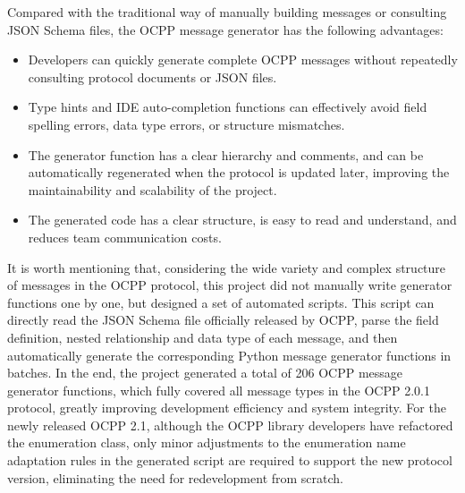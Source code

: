 \documentclass[
	english,
	ruledheaders=section,%
	class=report,%
	thesis={type=Report},%
	accentcolor=9c,%
	custommargins=true,%
	marginpar=false,%
	parskip=half-,%
	fontsize=11pt,%
	logofile={img/tuda_logo.pdf}, %
]{tudapub}
\begin{document}
Compared with the traditional way of manually building messages or consulting JSON Schema files, the \ac{OCPP} message generator has the following advantages:
\begin{itemize}
    \item Developers can quickly generate complete \ac{OCPP} messages without repeatedly consulting protocol documents or JSON files.
    \item Type hints and IDE auto-completion functions can effectively avoid field spelling errors, data type errors, or structure mismatches.
    \item The generator function has a clear hierarchy and comments, and can be automatically regenerated when the protocol is updated later, improving the maintainability and scalability of the project.
    \item The generated code has a clear structure, is easy to read and understand, and reduces team communication costs.
\end{itemize}


It is worth mentioning that, considering the wide variety and complex structure of messages in the \ac{OCPP} protocol, this project did not manually write generator functions one by one, but designed a set of automated scripts. This script can directly read the JSON Schema file officially released by \ac{OCPP}, parse the field definition, nested relationship and data type of each message, and then automatically generate the corresponding Python message generator functions in batches. In the end, the project generated a total of 206 \ac{OCPP} message generator functions, which fully covered all message types in the \ac{OCPP} 2.0.1 protocol, greatly improving development efficiency and system integrity. For the newly released \ac{OCPP} 2.1, although the \ac{OCPP} library developers have refactored the enumeration class, only minor adjustments to the enumeration name adaptation rules in the generated script are required to support the new protocol version, eliminating the need for redevelopment from scratch.
\end{document}
